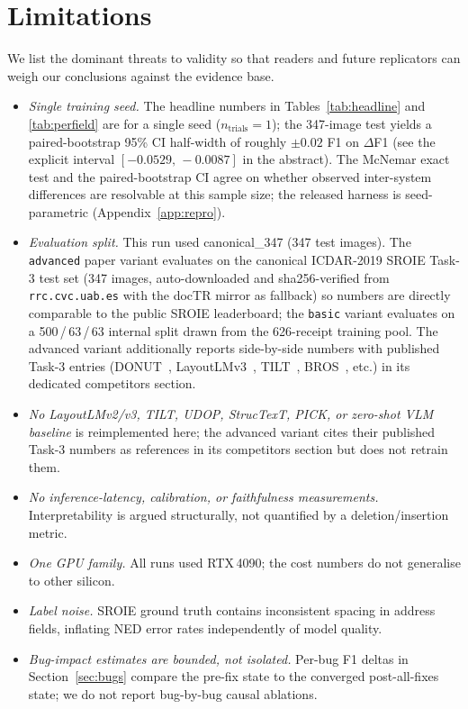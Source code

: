 \documentclass[conference]{IEEEtran}
\begin{document}
\section{Limitations}
\label{sec:limitations}

We list the dominant threats to validity so that readers and future
replicators can weigh our conclusions against the evidence base.

\begin{itemize}
  \item \emph{Single training seed.}  The headline numbers in
        Tables~\ref{tab:headline} and \ref{tab:perfield} are for a
        single seed ($n_{\text{trials}}=1$); the
        347-image test yields a paired-bootstrap 95\%
        CI half-width of roughly $\pm 0.02$ F1 on $\Delta$F1 (see the
        explicit interval $[-0.0529,\,-0.0087]$
        in the abstract).  The McNemar exact test
        and the paired-bootstrap CI agree on whether observed
        inter-system differences are resolvable at this sample size;
        the released harness is seed-parametric (Appendix~\ref{app:repro}).
  \item \emph{Evaluation split.}  This run used
        canonical\_347 (347 test images).  The
        \texttt{advanced} paper variant evaluates on the canonical
        ICDAR-2019 SROIE Task-3 test set (347 images, auto-downloaded
        and sha256-verified from \texttt{rrc.cvc.uab.es} with the
        docTR mirror as fallback) so numbers are directly comparable
        to the public SROIE leaderboard; the \texttt{basic} variant
        evaluates on a 500\,/\,63\,/\,63 internal split drawn from
        the 626-receipt training pool.  The advanced variant additionally reports
        side-by-side numbers with published Task-3 entries
        (DONUT~\cite{kim2022donut}, LayoutLMv3~\cite{huang2022layoutlmv3},
        TILT~\cite{powalski2021tilt}, BROS~\cite{hong2022bros}, etc.)
        in its dedicated competitors section.
  \item \emph{No LayoutLMv2/v3, TILT, UDOP, StrucTexT, PICK, or
        zero-shot VLM baseline} is reimplemented here; the advanced
        variant cites their published Task-3 numbers as references
        in its competitors section but does not retrain them.
  
  \item \emph{No inference-latency, calibration, or faithfulness
        measurements.}  Interpretability is argued structurally,
        not quantified by a deletion/insertion metric.
  \item \emph{One GPU family.}  All runs used RTX\,4090;
        the cost numbers do not generalise to other silicon.
  \item \emph{Label noise.}  SROIE ground truth contains
        inconsistent spacing in address fields, inflating NED
        error rates independently of model quality.
  \item \emph{Bug-impact estimates are bounded, not isolated.}
        Per-bug F1 deltas in Section~\ref{sec:bugs} compare the
        pre-fix state to the converged post-all-fixes state; we do
        not report bug-by-bug causal ablations.
\end{itemize}
\end{document}
